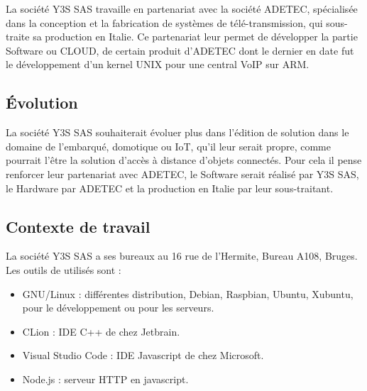 La société Y3S SAS travaille en partenariat avec la société ADETEC,
spécialisée dans la conception et la fabrication de systèmes de
télé-transmission, qui sous-traite sa production en Italie. Ce
partenariat leur permet de développer la partie \og Software \fg{} ou
CLOUD, de certain produit d'ADETEC dont le dernier en date fut le
développement d'un kernel UNIX pour une central VoIP sur ARM.

\subsection{Évolution}

La société Y3S SAS souhaiterait évoluer plus dans l'édition de
solution dans le domaine de l'embarqué, domotique ou IoT, qu'il leur
serait propre, comme pourrait l'être la solution d'accès à distance
d'objets connectés. Pour cela il pense renforcer leur partenariat avec
ADETEC, le \og Software \fg{} serait réalisé par Y3S SAS, le \og
Hardware \fg{} par ADETEC et la production en Italie par leur
sous-traitant.

\subsection{Contexte de travail}

La société Y3S SAS a ses bureaux au 16 rue de l'Hermite, Bureau A108,
Bruges. Les outils de utilisés sont :
\begin{itemize}
\item GNU/Linux : différentes distribution, Debian, Raspbian, Ubuntu,
  Xubuntu, pour le développement ou pour les serveurs.
\item CLion : IDE C++ de chez Jetbrain.
\item Visual Studio Code : IDE Javascript de chez Microsoft.
\item Node.js : serveur HTTP en javascript.
\end{itemize}

